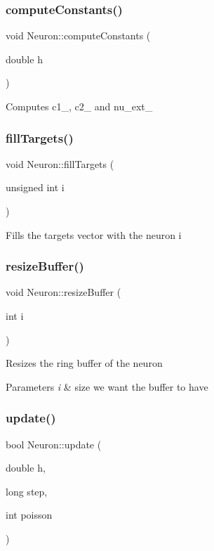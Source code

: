 \subsubsection{\texorpdfstring{compute\+Constants()}{computeConstants()}}
{\footnotesize\ttfamily void Neuron\+::compute\+Constants (\begin{DoxyParamCaption}\item[{double}]{h }\end{DoxyParamCaption})}

Computes c1\+\_\+, c2\+\_\+ and nu\+\_\+ext\+\_\+ \mbox{\label{classNeuron_a35f21c29541f5f1c429236fe8f3664c8}} 
\subsubsection{\texorpdfstring{fill\+Targets()}{fillTargets()}}
{\footnotesize\ttfamily void Neuron\+::fill\+Targets (\begin{DoxyParamCaption}\item[{unsigned int}]{i }\end{DoxyParamCaption})}

Fills the targets vector with the neuron i \mbox{\label{classNeuron_ac60114eae02b3e9e8cd41a7684a1da1e}} 
\subsubsection{\texorpdfstring{resize\+Buffer()}{resizeBuffer()}}
{\footnotesize\ttfamily void Neuron\+::resize\+Buffer (\begin{DoxyParamCaption}\item[{int}]{i }\end{DoxyParamCaption})}

Resizes the ring buffer of the neuron 
\begin{DoxyParams}{Parameters}
{\em i} & size we want the buffer to have \\
\hline
\end{DoxyParams}
\mbox{\label{classNeuron_a673bf2af51dc5ddd7e328bc00c235af2}} 
\subsubsection{\texorpdfstring{update()}{update()}}
{\footnotesize\ttfamily bool Neuron\+::update (\begin{DoxyParamCaption}\item[{double}]{h,  }\item[{long}]{step,  }\item[{int}]{poisson }\end{DoxyParamCaption})}

